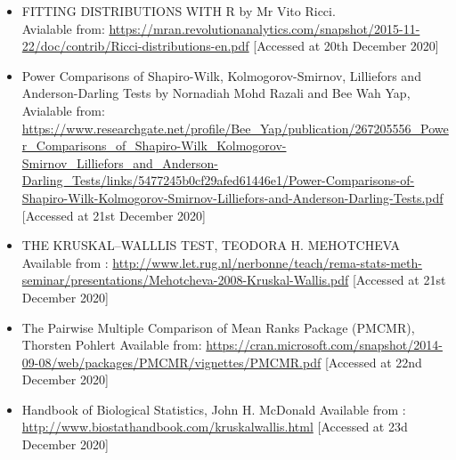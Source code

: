 \documentclass[
]{article}
\begin{document}
\begin{itemize}
\item
  FITTING DISTRIBUTIONS WITH R by Mr Vito Ricci.\\
  Avialable from:
  \url{https://mran.revolutionanalytics.com/snapshot/2015-11-22/doc/contrib/Ricci-distributions-en.pdf}
  {[}Accessed at 20th December 2020{]}
\item
  Power Comparisons of Shapiro-Wilk, Kolmogorov-Smirnov, Lilliefors and
  Anderson-Darling Tests by Nornadiah Mohd Razali and Bee Wah Yap,
  Avialable from:
  \url{https://www.researchgate.net/profile/Bee_Yap/publication/267205556_Power_Comparisons_of_Shapiro-Wilk_Kolmogorov-Smirnov_Lilliefors_and_Anderson-Darling_Tests/links/5477245b0cf29afed61446e1/Power-Comparisons-of-Shapiro-Wilk-Kolmogorov-Smirnov-Lilliefors-and-Anderson-Darling-Tests.pdf}
  {[}Accessed at 21st December 2020{]}
\item
  THE KRUSKAL--WALLLIS TEST, TEODORA H. MEHOTCHEVA Available from :
  \url{http://www.let.rug.nl/nerbonne/teach/rema-stats-meth-seminar/presentations/Mehotcheva-2008-Kruskal-Wallis.pdf}
  {[}Accessed at 21st December 2020{]}
\item
  The Pairwise Multiple Comparison of Mean Ranks Package (PMCMR),
  Thorsten Pohlert Available from:
  \url{https://cran.microsoft.com/snapshot/2014-09-08/web/packages/PMCMR/vignettes/PMCMR.pdf}
  {[}Accessed at 22nd December 2020{]}
\item
  Handbook of Biological Statistics, John H. McDonald Available from :
  \url{http://www.biostathandbook.com/kruskalwallis.html} {[}Accessed at
  23d December 2020{]}
\end{itemize}
\end{document}
